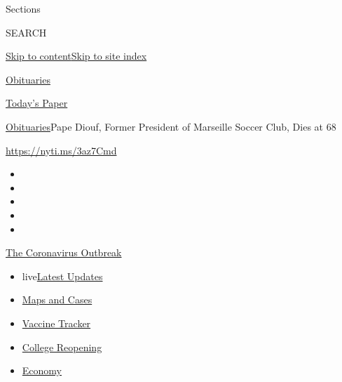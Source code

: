Sections

SEARCH

\protect\hyperlink{site-content}{Skip to
content}\protect\hyperlink{site-index}{Skip to site index}

\href{https://www.nytimes.com/section/obituaries}{Obituaries}

\href{https://myaccount.nytimes.com/auth/login?response_type=cookie\&client_id=vi}{}

\href{https://www.nytimes.com/section/todayspaper}{Today's Paper}

\href{/section/obituaries}{Obituaries}\textbar{}Pape Diouf, Former
President of Marseille Soccer Club, Dies at 68

\url{https://nyti.ms/3az7Cmd}

\begin{itemize}
\item
\item
\item
\item
\item
\end{itemize}

\href{https://www.nytimes.com/news-event/coronavirus?action=click\&pgtype=Article\&state=default\&region=TOP_BANNER\&context=storylines_menu}{The
Coronavirus Outbreak}

\begin{itemize}
\tightlist
\item
  live\href{https://www.nytimes.com/2020/08/03/world/coronavirus-covid-19.html?action=click\&pgtype=Article\&state=default\&region=TOP_BANNER\&context=storylines_menu}{Latest
  Updates}
\item
  \href{https://www.nytimes.com/interactive/2020/us/coronavirus-us-cases.html?action=click\&pgtype=Article\&state=default\&region=TOP_BANNER\&context=storylines_menu}{Maps
  and Cases}
\item
  \href{https://www.nytimes.com/interactive/2020/science/coronavirus-vaccine-tracker.html?action=click\&pgtype=Article\&state=default\&region=TOP_BANNER\&context=storylines_menu}{Vaccine
  Tracker}
\item
  \href{https://www.nytimes.com/2020/08/02/us/covid-college-reopening.html?action=click\&pgtype=Article\&state=default\&region=TOP_BANNER\&context=storylines_menu}{College
  Reopening}
\item
  \href{https://www.nytimes.com/live/2020/08/03/business/stock-market-today-coronavirus?action=click\&pgtype=Article\&state=default\&region=TOP_BANNER\&context=storylines_menu}{Economy}
\end{itemize}

